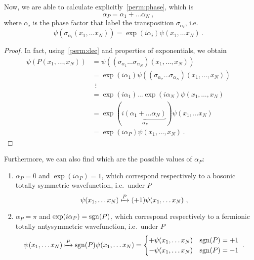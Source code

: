     Now, we are able to calculate explicitly~\eqref{perm:phase}, which is 
    \begin{equation}
        \alpha_P = \alpha_1 + \ldots \alpha_N~,
    \end{equation}
    where $\alpha_i$ is the phase factor that label the transposition $\sigma_{\alpha_i}$, i.e.
    \begin{equation*}
        \psi(\sigma_{\alpha_i}(x_1,\ldots x_N)) = \exp(i \alpha_i) \psi (x_1,\ldots x_N) ~.
    \end{equation*}
    \begin{proof}
        In fact, using~\eqref{perm:dec} and properties of exponentials, we obtain
        \begin{equation*}
        \begin{aligned}
            \psi(P(x_1,\ldots, x_N)) & = \psi((\sigma_{\alpha_1} \ldots \sigma_{\alpha_N}) (x_1,\ldots, x_N)) \\ & = \exp (i \alpha_1) \psi((\sigma_{\alpha_2} \ldots \sigma_{\alpha_N}) (x_1,\ldots, x_N)) \\ & ~~ \vdots \\ & = \exp (i \alpha_1) \ldots \exp (i \alpha_N) \psi(x_1,\ldots, x_N) \\ & = \exp (i \underbrace{(\alpha_1 + \ldots \alpha_N)}_{\alpha_P}) \psi(x_1,\ldots x_N) \\ &  = \exp (i \alpha_P) \psi(x_1,\ldots, x_N) ~.
        \end{aligned}
        \end{equation*}
    \end{proof}
    Furthermore, we can also find which are the possible values of $\alpha_P$:
    \begin{enumerate}
        \item $\alpha_P = 0$ and $\exp(i \alpha_P) = 1$, which correspond respectively to a bosonic totally symmetric wavefunction, i.e.~under $P$
        \begin{equation*}
            \psi(x_1, \ldots x_N) \xmapsto{P} (+ 1) \psi(x_1, \ldots x_N) ~,
        \end{equation*}
        \item $\alpha_P = \pi$ and $\exp(i \alpha_P) = \operatorname{sgn}(P)$, which correspond respectively to a fermionic totally antysymmetric wavefunction, i.e.~under $P$
        \begin{equation*}
            \psi(x_1, \ldots x_N) \xmapsto{P} \operatorname{sgn}(P) \psi(x_1, \ldots x_N) = \begin{cases}
                + \psi(x_1, \ldots x_N) & \operatorname{sgn}(P) = +1 \\
                - \psi(x_1, \ldots x_N) & \operatorname{sgn}(P) = - 1 \\
            \end{cases} ~.
        \end{equation*}
    \end{enumerate}

